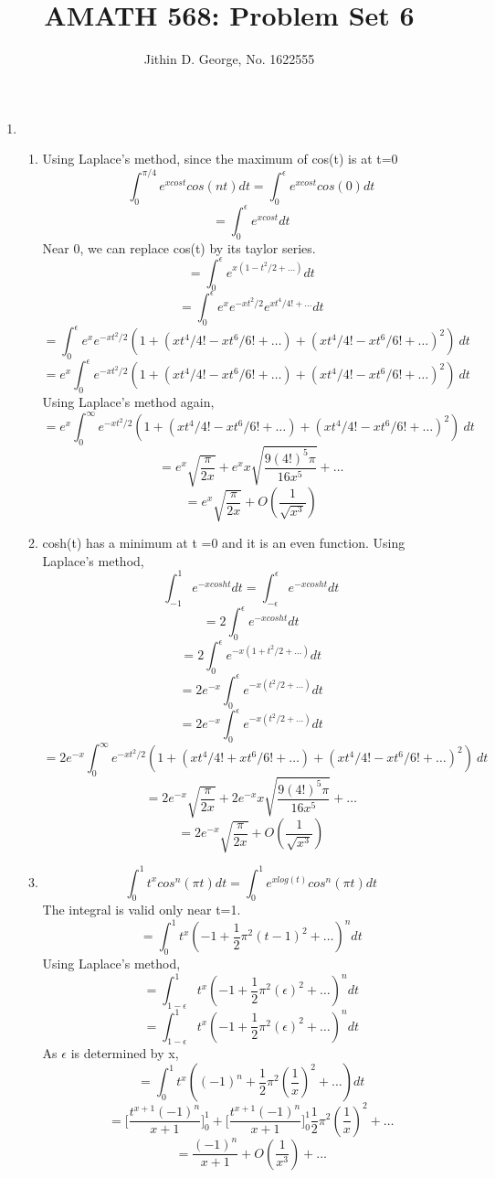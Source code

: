 \documentclass[a4paper]{article}
\title{AMATH 568: Problem Set 6}
\author{Jithin D. George, No. 1622555}
\begin{document}
\maketitle
\begin{enumerate}

	
\item 
\begin{enumerate}
	
	\item
Using Laplace's method, since the maximum of cos(t) is at t=0	
\[ \int_{0}^{\pi/4} e^{xcost}cos(nt)dt =  \int_{0}^{\epsilon} e^{xcost}cos(0)dt \]
\[ =  \int_{0}^{\epsilon} e^{xcost}dt \]
Near 0, we can replace cos(t) by its taylor series.
\[ =  \int_{0}^{\epsilon} e^{x(1- t^2/2 + \ldots)}dt \]
\[ =  \int_{0}^{\epsilon} e^{x}e^{- xt^2/2}e^{ xt^4/4! +\ldots}  dt \]
\[ =  \int_{0}^{\epsilon} e^{x}e^{- xt^2/2}(1+(xt^4/4!-xt^6/6! +\ldots ) +(xt^4/4!-xt^6/6! +\ldots )^2) \ dt \]
\[ = e^{x} \int_{0}^{\epsilon} e^{- xt^2/2}(1+(xt^4/4!-xt^6/6! +\ldots ) +(xt^4/4!-xt^6/6! +\ldots )^2) \ dt \]
Using Laplace's method again, 
\[ =  e^{x} \int_{0}^{ \infty }e^{- xt^2/2}(1+(xt^4/4!-xt^6/6! +\ldots ) +(xt^4/4!-xt^6/6! +\ldots )^2) \ dt\]
\[ =  e^{x} \sqrt{\frac{\pi}{2x}} + e^{x} x  \sqrt{\frac{9 (4!)^5 \pi}{16 x^5}}+ \ldots\]
\[ =  e^{x} \sqrt{\frac{\pi}{2x}} + O(\frac{1}{\sqrt{x^3}})\]
	\item
	cosh(t) has a minimum at t =0 and it is an even function. Using Laplace's method, 
	\[ \int_{-1}^{1} e^{-xcosht}dt =\int_{-\epsilon}^{\epsilon} e^{-xcosht}dt  \] 
\[ = 2 \int_{0}^{\epsilon} e^{-xcosht}dt  \] 
\[ = 2 \int_{0}^{\epsilon} e^{-x(1+ t^2/2 + \ldots)}dt  \]
\[ = 2 e^{-x}\int_{0}^{\epsilon} e^{-x( t^2/2 + \ldots)}dt  \] 	 
\[ = 2 e^{-x}\int_{0}^{\epsilon} e^{-x( t^2/2 + \ldots)}dt  \] 
\[ =  2 e^{-x}\int_{0}^{ \infty }e^{- xt^2/2}(1+(xt^4/4!+xt^6/6! +\ldots ) +(xt^4/4!-xt^6/6! +\ldots )^2) \ dt\]
\[ = 2 e^{-x}\sqrt{\frac{\pi}{2x}} + 2e^{-x} x  \sqrt{\frac{9 (4!)^5 \pi}{16 x^5}}+ \ldots\]
\[ =2 e^{-x} \sqrt{\frac{\pi}{2x}} + O(\frac{1}{\sqrt{x^3}})\]	
		\item
		
		\[ \int_{0}^{1} t^{x}cos^n(\pi t)dt  =\int_{0}^{1} e^{xlog(t)}cos^n(\pi t)dt \]
The integral is valid only near t=1.
\[ =\int_{0}^{1} t^x ( -1 + \frac{1}{2}\pi^2(t -1)^2+\ldots)^n dt \]
Using Laplace's method,
\[ =\int_{1-\epsilon}^{1} t^x ( -1 + \frac{1}{2}\pi^2(\epsilon)^2+\ldots)^n dt \]
\[ =\int_{1-\epsilon}^{1} t^x ( -1 + \frac{1}{2}\pi^2(\epsilon)^2+\ldots)^n dt \]
As $\epsilon$ is determined by x, 
\[ =\int_{0}^{1} t^x ( (-1)^n + \frac{1}{2}\pi^2(\frac{1}{x})^2+\ldots) dt \]
\[ =  \Big[\frac{t^{x+1} (-1)^n}{x+1} \Big]_0^1   + \Big[\frac{t^{x+1} (-1)^n}{x+1} \Big]_0^1\frac{1}{2}\pi^2(\frac{1}{x})^2+\ldots  \]
\[ =  \frac{ (-1)^n}{x+1}    + O(\frac{1}{x^3})+\ldots  \]


\end{enumerate}
\end{enumerate}
\end{document}

